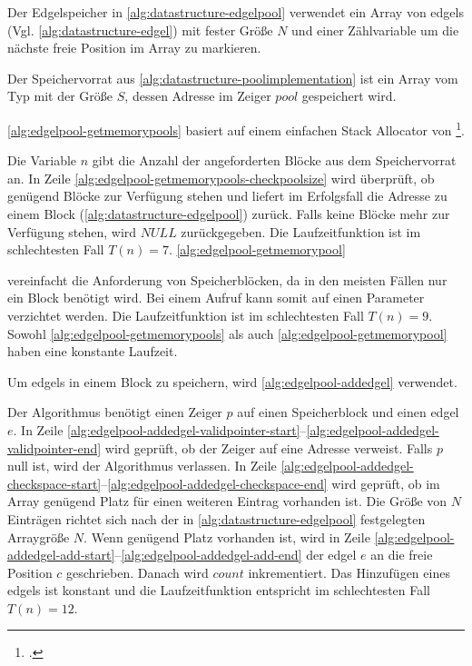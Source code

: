 Der Edgelspeicher in \autoref{alg:datastructure-edgelpool} verwendet ein Array von \glspl{edgel}
 (Vgl. \autoref{alg:datastructure-edgel}) mit fester Größe $N$ und einer Zählvariable um die nächste freie Position im
 Array zu markieren.

Der Speichervorrat aus \autoref{alg:datastructure-poolimplementation} ist ein Array vom Typ
  mit der Größe $S$, dessen Adresse im Zeiger $\mathit{pool}$ gespeichert wird.

\autoref{alg:edgelpool-getmemorypools} basiert auf einem einfachen Stack Allocator von
 \citeauthor{kr}\footcite[Vgl.][S.~100--104]{kr}.

Die Variable $n$ gibt die Anzahl der angeforderten Blöcke aus dem Speichervorrat an. In Zeile
 \ref{alg:edgelpool-getmemorypools-checkpoolsize} wird überprüft, ob genügend Blöcke zur Verfügung stehen und liefert
 im Erfolgsfall die Adresse zu einem Block (\autoref{alg:datastructure-edgelpool}) zurück. Falls keine Blöcke mehr zur
 Verfügung stehen, wird $\mathit{NULL}$ zurückgegeben. Die Laufzeitfunktion ist im schlechtesten Fall $T(n)=7$.
 \autoref{alg:edgelpool-getmemorypool}

 vereinfacht die Anforderung von Speicherblöcken, da in den meisten Fällen nur ein Block benötigt wird. Bei einem
 Aufruf kann somit auf einen Parameter verzichtet werden. Die Laufzeitfunktion ist im schlechtesten Fall $T(n)=9$.
 Sowohl \autoref{alg:edgelpool-getmemorypools} als auch \autoref{alg:edgelpool-getmemorypool} haben eine konstante
 Laufzeit.

Um \glspl{edgel} in einem Block zu speichern, wird \autoref{alg:edgelpool-addedgel} verwendet.

Der Algorithmus benötigt einen Zeiger $p$ auf einen Speicherblock und einen \gls{edgel} $e$. In Zeile
 \ref{alg:edgelpool-addedgel-validpointer-start}--\ref{alg:edgelpool-addedgel-validpointer-end} wird geprüft, ob der
 Zeiger auf eine Adresse verweist. Falls $p$ null ist, wird der Algorithmus verlassen. In Zeile
 \ref{alg:edgelpool-addedgel-checkspace-start}--\ref{alg:edgelpool-addedgel-checkspace-end} wird geprüft, ob im Array
 genügend Platz für einen weiteren Eintrag vorhanden ist. Die Größe von $N$ Einträgen richtet sich nach der in
 \autoref{alg:datastructure-edgelpool} festgelegten Arraygröße $N$. Wenn genügend Platz vorhanden ist, wird in Zeile
 \ref{alg:edgelpool-addedgel-add-start}--\ref{alg:edgelpool-addedgel-add-end} der \gls{edgel} $e$ an die freie
 Position $c$ geschrieben. Danach wird $\mathit{count}$ inkrementiert. Das Hinzufügen eines \glspl{edgel} ist konstant
 und die Laufzeitfunktion entspricht im schlechtesten Fall $T(n) = 12$.

